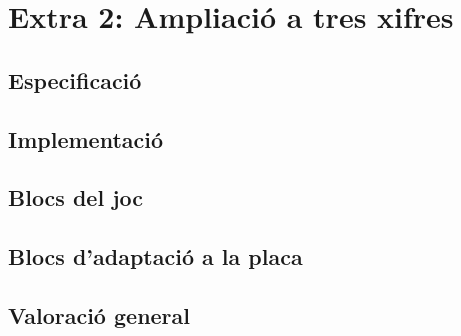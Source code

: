 \chapter{Extra 2: Ampliació a tres xifres}

\section{Especificació}


\section{Implementació}


\section{Blocs del joc}

\section{Blocs d'adaptació a la placa}

\section{Valoració general}

